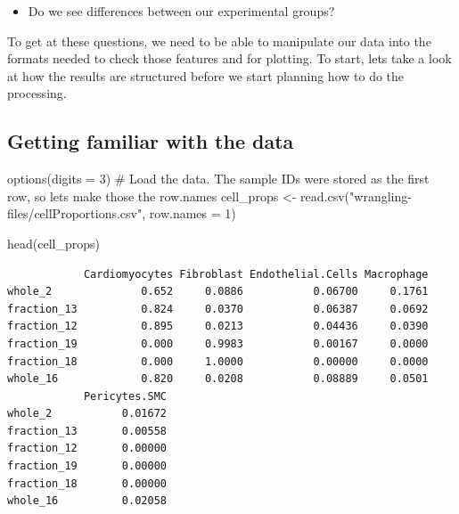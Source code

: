 \documentclass[
  letterpaper,
  DIV=11,
  numbers=noendperiod]{scrreprt}
\newenvironment{Shaded}{\begin{snugshade}}{\end{snugshade}}
\newcommand{\AttributeTok}[1]{\textcolor[rgb]{0.40,0.45,0.13}{#1}}
\newcommand{\CommentTok}[1]{\textcolor[rgb]{0.37,0.37,0.37}{#1}}
\newcommand{\DecValTok}[1]{\textcolor[rgb]{0.68,0.00,0.00}{#1}}
\newcommand{\FunctionTok}[1]{\textcolor[rgb]{0.28,0.35,0.67}{#1}}
\newcommand{\NormalTok}[1]{\textcolor[rgb]{0.00,0.23,0.31}{#1}}
\newcommand{\OtherTok}[1]{\textcolor[rgb]{0.00,0.23,0.31}{#1}}
\newcommand{\StringTok}[1]{\textcolor[rgb]{0.13,0.47,0.30}{#1}}
\providecommand{\tightlist}{%
  \setlength{\itemsep}{0pt}\setlength{\parskip}{0pt}}\usepackage{longtable,booktabs,array}
\begin{document}
\begin{itemize}
\tightlist
\item
  Do we see differences between our experimental groups?
\end{itemize}

To get at these questions, we need to be able to manipulate our data
into the formats needed to check those features and for plotting. To
start, lets take a look at how the results are structured before we
start planning how to do the processing.

\subsection{Getting familiar with the
data}\label{getting-familiar-with-the-data}

\begin{Shaded}
\begin{Highlighting}[]
\FunctionTok{options}\NormalTok{(}\AttributeTok{digits =} \DecValTok{3}\NormalTok{)}
\CommentTok{\# Load the data. The sample IDs were stored as the first row, so lets make those the row.names}
\NormalTok{cell\_props }\OtherTok{\textless{}{-}} \FunctionTok{read.csv}\NormalTok{(}\StringTok{"wrangling{-}files/cellProportions.csv"}\NormalTok{,}
                       \AttributeTok{row.names =} \DecValTok{1}\NormalTok{)}

\FunctionTok{head}\NormalTok{(cell\_props)}
\end{Highlighting}
\end{Shaded}

\begin{verbatim}
            Cardiomyocytes Fibroblast Endothelial.Cells Macrophage
whole_2              0.652     0.0886           0.06700     0.1761
fraction_13          0.824     0.0370           0.06387     0.0692
fraction_12          0.895     0.0213           0.04436     0.0390
fraction_19          0.000     0.9983           0.00167     0.0000
fraction_18          0.000     1.0000           0.00000     0.0000
whole_16             0.820     0.0208           0.08889     0.0501
            Pericytes.SMC
whole_2           0.01672
fraction_13       0.00558
fraction_12       0.00000
fraction_19       0.00000
fraction_18       0.00000
whole_16          0.02058
\end{verbatim}
\end{document}

